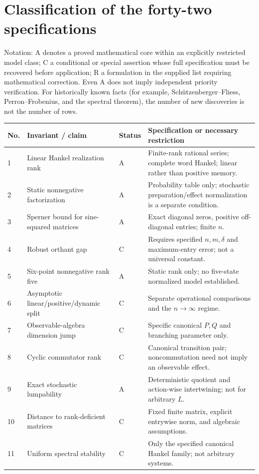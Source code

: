 \documentclass[11pt,a4paper,oneside]{book}
\begin{document}
\section{Classification of the forty-two specifications}
Notation: A denotes a proved mathematical core within an explicitly restricted model class; C a conditional or special assertion whose full specification must be recovered before application; R a formulation in the supplied list requiring mathematical correction. Even A does not imply independent priority verification. For historically known facts (for example, Sch\"utzenberger--Fliess, Perron--Frobenius, and the spectral theorem), the number of new discoveries is not the number of rows.
\begingroup\small
\begin{longtable}{p{}p{}p{}p{}}
\toprule No.&Invariant / claim&Status&Specification or necessary restriction\\\midrule\endhead
1&Linear Hankel realization rank&A&Finite-rank rational series; complete word Hankel; linear rather than positive memory.\\
2&Static nonnegative factorization&A&Probability table only; stochastic preparation/effect normalization is a separate condition.\\
3&Sperner bound for sine-squared matrices&A&Exact diagonal zeros, positive off-diagonal entries; finite $n$.\\
4&Robust orthant gap&C&Requires specified $n,m,\delta$ and maximum-entry error; not a universal constant.\\
5&Six-point nonnegative rank five&A&Static rank only; no five-state normalized model established.\\
6&Asymptotic linear/positive/dynamic split&C&Separate operational comparisons and the $n\to\infty$ regime.\\
7&Observable-algebra dimension jump&C&Specific canonical $P,Q$ and branching parameter only.\\
8&Cyclic commutator rank&C&Canonical transition pair; noncommutation need not imply an observable effect.\\
9&Exact stochastic lumpability&A&Deterministic quotient and action-wise intertwining; not for arbitrary $L$.\\
10&Distance to rank-deficient matrices&C&Fixed finite matrix, explicit entrywise norm, and algebraic assumptions.\\
11&Uniform spectral stability&C&Only the specified canonical Hankel family; not arbitrary systems.\\

\end{longtable}
\end{document}

